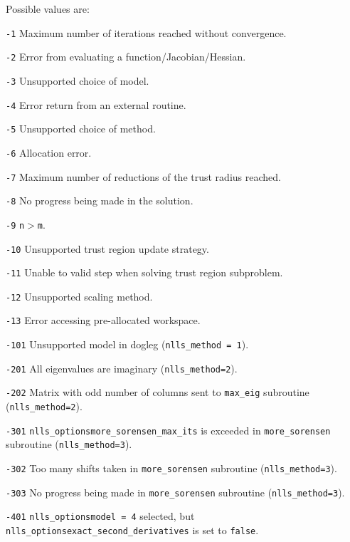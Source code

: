 
Possible values are:
\begin{description}
\item{} {\tt -1} Maximum number of iterations reached without convergence.
\item{} {\tt -2} Error from evaluating a function/Jacobian/Hessian.
\item{} {\tt -3} Unsupported choice of model.
\item{} {\tt -4} Error return from an external routine.
\item{} {\tt -5} Unsupported choice of method.
\item{} {\tt -6} Allocation error.
\item{} {\tt -7} Maximum number of reductions of the trust radius reached.
\item{} {\tt -8} No progress being made in the solution.
\item{} {\tt -9} \texttt{n}$>$\texttt{m}.
\item{} {\tt -10} Unsupported trust region update strategy.
\item{} {\tt -11} Unable to valid step when solving trust region subproblem.
\item{} {\tt -12} Unsupported scaling method.
\item{} {\tt -13} Error accessing pre-allocated workspace.
\item{} {\tt -101} Unsupported model in dogleg (\texttt{nlls\_method = 1}).
\item{} {\tt -201}  All eigenvalues are imaginary (\texttt{nlls\_method=2}).
\item{} {\tt -202} Matrix with odd number of columns sent to \texttt{max\_eig} subroutine (\texttt{nlls\_method=2}).
\item{} {\tt -301} {\tt nlls\_options\ct more\_sorensen\_max\_its} is exceeded in \texttt{more\_sorensen} subroutine (\texttt{nlls\_method=3}).
\item{} {\tt -302} Too many shifts taken in \texttt{more\_sorensen} subroutine (\texttt{nlls\_method=3}).
\item{} {\tt -303} No progress being made in \texttt{more\_sorensen} subroutine (\texttt{nlls\_method=3}).
\item{} {\tt -401} {\tt nlls\_options\ct model = 4} selected, but {\tt nlls\_options\ct exact\_second\_derivatives} is set to {\tt false}.
\end{description}
